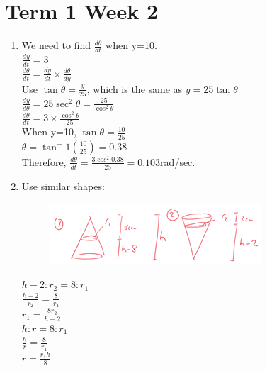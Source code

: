 \documentclass[../main.tex]{subfiles}
\begin{document}
\section*{Term 1 Week 2}
    \begin{enumerate}
    \item 
    We need to find \(\frac{d\theta}{dt}\) when y=10.\\
    \(\frac{dy}{dt}=3\)\\
    
    \( \frac{d\theta}{dt}=\frac{dy}{dt}\times \frac{d\theta}{dy}\)\\
    
    Use \(\tan{\theta}=\frac{y}{25}\), which is the same as \(y=25 \tan{\theta}\)\\

    \(\frac{dy}{d\theta}=25\sec^2{\theta}=\frac{25}{\cos^2{\theta}}\)\\

    \(\frac{d\theta}{dt}=3\times \frac{\cos^2{\theta}}{25}\)\\

    When y=10, \(\tan{\theta}=\frac{10}{25}\)\\

    \(\theta=\tan^-1{(\frac{10}{25})}=0.38\)\\

    Therefore, \(\frac{d\theta}{dt}=\frac{3\cos^2{0.38}}{25}=0.103\)rad/sec.\\

    \item 
    Use similar shapes:\\
    \begin{figure}[H]
        \includegraphics{images/t1w2q2_a.png}
    \end{figure}
    \(h-2 : r_2 = 8 : r_1\)\\
    \(\frac{h-2}{r_2}=\frac{8}{r_1}\)\\
    \(r_1=\frac{8r_2}{h-2}\)\\

    \(h:r=8:r_1\)\\
    \(\frac{h}{r}=\frac{8}{r_1}\)\\
    \(r=\frac{r_1 h}{8}\)\\


\end{enumerate}
\end{document}
